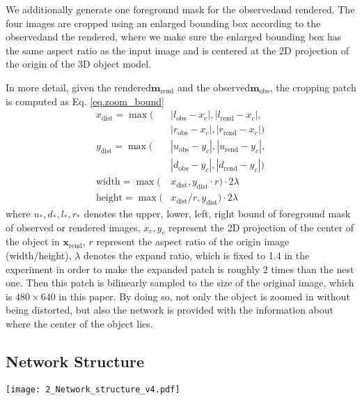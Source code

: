 \documentclass[twocolumn]{svjour3}
\newcommand{\dimnet}[0]{DeepIM}
\newcommand{\xrend}[0]{\mathbf{x}_{\text{rend}}}
\newcommand{\mreal}[0]{\mathbf{m}_{\text{obs}}}
\newcommand{\mrend}[0]{\mathbf{m}_{\text{rend}}}
\newcommand{\rend}[0]{rendered}
\newcommand{\real}[0]{observed}
\begin{document}
We additionally generate one foreground mask for the \real\image and \rend\image. The four images are cropped using an enlarged bounding box according to the \real\mask and the \rend\mask, where we make sure the enlarged bounding box has the same aspect ratio as the input image and is centered at the 2D projection of the origin of the 3D object model. 

In more detail, given the \rend\mask $\mrend$ and the \real\mask $\mreal$, the cropping patch is computed as Eq. \ref{eq.zoom_bound}
\begin{equation}
\begin{split}
x_{\text{dist}} = \max(&|l_{\text{obs}}-x_{c}|, |l_{\text{rend}}-x_{c}|,\\
			  &|r_{\text{obs}}-x_{c}|, |r_{\text{rend}}-x_{c}|)\\
y_{\text{dist}} = \max(&|u_{\text{obs}}-y_{c}|, |u_{\text{rend}}-y_{c}|,\\
			  &|d_{\text{obs}}-y_{c}|, |d_{\text{rend}}-y_{c}|)\\
\text{width} = \max(&x_{\text{dist}}, y_{\text{dist}} \cdot r) \cdot 2\lambda\\
\text{height} = \max(&x_{\text{dist}} / r, y_{\text{dist}}) \cdot 2\lambda
\end{split}
\label{eq.zoom_bound}
\end{equation}
where $u_{*}, d_{*}, l_{*}, r_{*}$ denotes the upper, lower, left, right bound of foreground mask of observed or rendered images, $x_{c}, y_{c}$ represent the 2D projection of the center of the object in $\xrend$, $r$ represent the aspect ratio of the origin image (width/height), $\lambda$ denotes the expand ratio, which is fixed to 1.4 in the experiment in order to make the expanded patch is roughly 2 times than the nest one. Then this patch is bilinearly sampled to the size of the original image, which is $480 \times 640$ in this paper. By doing so, not only the object is zoomed in without being distorted, but also the network is provided with the information about where the center of the object lies.

\subsection{Network Structure}
\label{sec.network_structure}
\begin{figure*}[t]
	\centering
	\texttt{[image: 2\_Network\_structure\_v4.pdf]}
	\caption{{\dimnet\ uses a FlowNetSimple backbone to predict a relative SE(3) transformation to match the observed and \rend\ image of an object.}}
	\label{fig:network}
    
\end{figure*}
\end{document}
